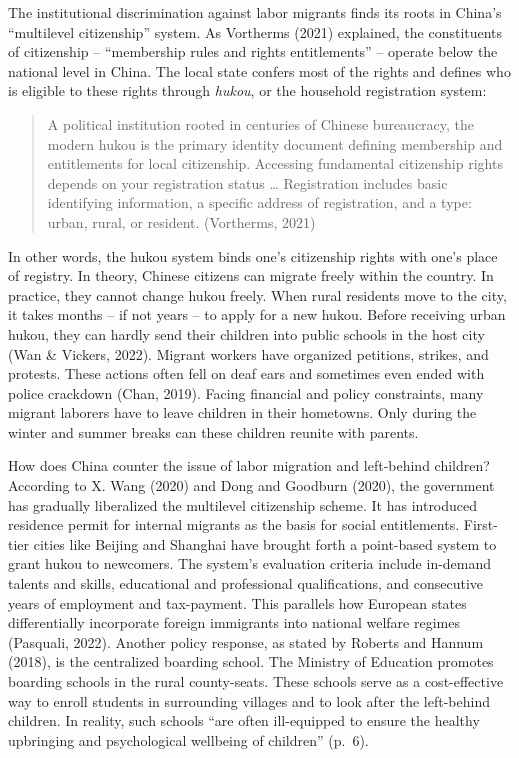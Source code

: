 \documentclass[
  man,floatsintext]{apa7}
\begin{document}
The institutional discrimination against labor migrants finds its roots in China's ``multilevel citizenship'' system. As Vortherms (2021) explained, the constituents of citizenship -- ``membership rules and rights entitlements'' -- operate below the national level in China. The local state confers most of the rights and defines who is eligible to these rights through \emph{hukou}, or the household registration system:

\begin{quote}
A political institution rooted in centuries of Chinese bureaucracy, the modern hukou is the primary identity document defining membership and entitlements for local citizenship. Accessing fundamental citizenship rights depends on your registration status \ldots{} Registration includes basic identifying information, a specific address of registration, and a type: urban, rural, or resident. (Vortherms, 2021)
\end{quote}

In other words, the hukou system binds one's citizenship rights with one's place of registry. In theory, Chinese citizens can migrate freely within the country. In practice, they cannot change hukou freely. When rural residents move to the city, it takes months -- if not years -- to apply for a new hukou. Before receiving urban hukou, they can hardly send their children into public schools in the host city (Wan \& Vickers, 2022). Migrant workers have organized petitions, strikes, and protests. These actions often fell on deaf ears and sometimes even ended with police crackdown (Chan, 2019). Facing financial and policy constraints, many migrant laborers have to leave children in their hometowns. Only during the winter and summer breaks can these children reunite with parents.

How does China counter the issue of labor migration and left-behind children? According to X. Wang (2020) and Dong and Goodburn (2020), the government has gradually liberalized the multilevel citizenship scheme. It has introduced residence permit for internal migrants as the basis for social entitlements. First-tier cities like Beijing and Shanghai have brought forth a point-based system to grant hukou to newcomers. The system's evaluation criteria include in-demand talents and skills, educational and professional qualifications, and consecutive years of employment and tax-payment. This parallels how European states differentially incorporate foreign immigrants into national welfare regimes (Pasquali, 2022). Another policy response, as stated by Roberts and Hannum (2018), is the centralized boarding school. The Ministry of Education promotes boarding schools in the rural county-seats. These schools serve as a cost-effective way to enroll students in surrounding villages and to look after the left-behind children. In reality, such schools ``are often ill-equipped to ensure the healthy upbringing and psychological wellbeing of children'' (p.~6).
\end{document}
